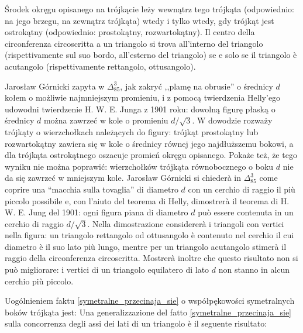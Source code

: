 \begin{proposition}
	Środek okręgu opisanego na trójkącie leży wewnątrz tego trójkąta (odpowiednio: na jego brzegu, na zewnątrz trójkąta) wtedy i tylko wtedy, gdy trójkąt jest ostrokątny (odpowiednio: prostokątny, rozwartokątny). %
	Il centro della circonferenza circoscritta a un triangolo si trova all'interno del triangolo (rispettivamente sul suo bordo, all'esterno del triangolo) se e solo se il triangolo è acutangolo (rispettivamente rettangolo, ottusangolo). %
\end{proposition}

Jarosław Górnicki zapyta w $\Delta_{85}^{3}$, jak zakryć ,,plamę na obrusie'' o średnicy $d$ kołem o możliwie najmniejszym promieniu, i z pomocą twierdzenia Helly'ego udowodni twierdzenie H. W. E. Junga z 1901 roku: dowolną figurę płaską o średnicy $d$ można zawrzeć w kole o promieniu $d/\sqrt{3}$. %
W dowodzie rozważy trójkąty o wierzchołkach należących do figury: trójkąt prostokątny lub rozwartokątny zawiera się w kole o średnicy równej jego najdłuższemu bokowi, a dla trójkąta ostrokątnego oszacuje promień okręgu opisanego. %
Pokaże też, że tego wyniku nie można poprawić: wierzchołków trójkąta równobocznego o boku $d$ nie da się zawrzeć w mniejszym kole. %
Jarosław Górnicki si chiederà in $\Delta_{85}^{3}$ come coprire una ``macchia sulla tovaglia'' di diametro $d$ con un cerchio di raggio il più piccolo possibile e, con l'aiuto del teorema di Helly, dimostrerà il teorema di H. W. E. Jung del 1901: ogni figura piana di diametro $d$ può essere contenuta in un cerchio di raggio $d/\sqrt{3}$. %
Nella dimostrazione considererà i triangoli con vertici nella figura: un triangolo rettangolo od ottusangolo è contenuto nel cerchio il cui diametro è il suo lato più lungo, mentre per un triangolo acutangolo stimerà il raggio della circonferenza circoscritta. %
Mostrerà inoltre che questo risultato non si può migliorare: i vertici di un triangolo equilatero di lato $d$ non stanno in alcun cerchio più piccolo. %

Uogólnieniem faktu \ref{symetralne_przecinaja_sie} o współpękowości symetralnych boków trójkąta jest: %
Una generalizzazione del fatto \ref{symetralne_przecinaja_sie} sulla concorrenza degli assi dei lati di un triangolo è il seguente risultato: %

